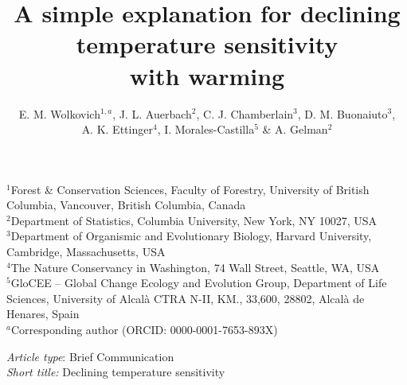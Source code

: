 \documentclass[11pt,letter]{article}
\begin{document}
\title{A simple explanation for declining temperature sensitivity \\ with warming} %
\author{E. M. Wolkovich$^{1,a}$,  J. L. Auerbach$^{2}$, C. J. Chamberlain$^{3}$, D. M. Buonaiuto$^{3}$, \\ A. K. Ettinger$^4$, I. Morales-Castilla$^{5}$ \& A. Gelman$^{2}$} 
\date{} %
\maketitle
$^1$Forest \& Conservation Sciences, Faculty of Forestry, University of British Columbia, Vancouver, British Columbia, Canada\\
$^2$Department of Statistics, Columbia University, New York, NY 10027, USA\\
$^3$Department of Organismic and Evolutionary Biology, Harvard University, Cambridge, Massachusetts, USA\\
$^4$The Nature Conservancy in Washington, 74 Wall Street, Seattle, WA, USA\\
$^5$GloCEE -- Global Change Ecology and Evolution Group, Department of Life Sciences, University of Alcal\`a CTRA N-II, KM., 33,600, 28802, Alcal\`a de Henares, Spain\\
$^a$Corresponding author (ORCID: 0000-0001-7653-893X)
\vspace{3ex}

\emph{Article type}: Brief Communication\\
\emph{Short title:} Declining temperature sensitivity\\


\end{document}
